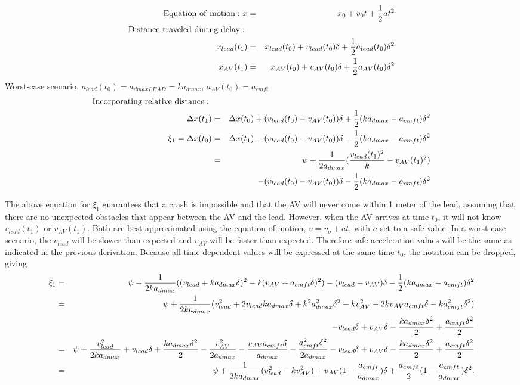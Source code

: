 \documentclass[conference]{IEEEtran}
\begin{document}
\begin{appendix}
\begin{eqnarray*}
{\rm Equation\ of\ motion:\ } x &=& x_0 + v_0t + {1\over 2}at^2 \\
{\rm Distance\ traveled\ during\ delay : \ } \\
x_{lead}(t_1) &=& x_{lead}(t_0)+v_{lead}(t_0)\delta+{1\over 2}a_{lead}(t_0)\delta^2 \\
x_{AV}(t_1) &=& x_{AV}(t_0)+v_{AV}(t_0)\delta+{1\over 2}a_{AV}(t_0)\delta^2
\end{eqnarray*}
Worst-case scenario, $a_{lead}(t_0)=a_{dmaxLEAD}=ka_{dmax}$, $a_{AV}(t_0)=a_{cmft}$
\begin{eqnarray*}
{\rm Incorporating\ relative\ distance:\ } \\
\Delta x(t_1) &=& \Delta x(t_0) + (v_{lead}(t_0)-v_{AV}(t_0))\delta + {1\over 2}(ka_{dmax}-a_{cmft})\delta^2\\
\xi_1 = \Delta x(t_0) &=& \Delta x(t_1) - (v_{lead}(t_0)-v_{AV}(t_0))\delta - {1\over 2}(ka_{dmax}-a_{cmft})\delta^2\\
&=& \psi+{1\over 2a_{dmax}}({v_{lead}(t_1)^2\over k}-v_{AV}(t_1)^2) \\
&& - (v_{lead}(t_0)-v_{AV}(t_0))\delta - {1\over 2}(ka_{dmax}-a_{cmft})\delta^2
\end{eqnarray*}

The above equation for $\xi_1$ guarantees that a crash is impossible and that the AV will never come within 1 meter of the lead, assuming that there are no unexpected obstacles that appear between the AV and the lead. However, when the AV arrives at time $t_0$, it will not know $v_{lead}(t_1)$ or $v_{AV}(t_1)$. Both are best approximated using the equation of motion, $v=v_o+at$, with $a$ set to a safe value. In a worst-case scenario, the $v_{lead}$ will be slower than expected and $v_{AV}$ will be faster than expected. Therefore safe acceleration values will be the same as indicated in the previous derivation. Because all time-dependent values will be expressed at the same time $t_0$, the notation can be dropped, giving
\begin{eqnarray*}
\xi_1 &=& \psi+{1\over 2ka_{dmax}}((v_{lead}+ka_{dmax}\delta)^2-k(v_{AV}+a_{cmft}\delta)^2) - (v_{lead}-v_{AV})\delta - {1\over 2}(ka_{dmax}-a_{cmft})\delta^2 \\
&=& \psi+{1\over 2ka_{dmax}}(v_{lead}^2+2v_{lead}ka_{dmax}\delta+k^2a_{dmax}^2\delta^2-kv_{AV}^2-2kv_{AV}a_{cmft}\delta-ka_{cmft}^2\delta^2) \\
&& -v_{lead}\delta+v_{AV}\delta-{ka_{dmax}\delta^2\over 2}+{a_{cmft}\delta^2\over2} \\
&=& \psi+{v_{lead}^2\over 2ka_{dmax}}+{v_{lead}\delta}+{ka_{dmax}\delta^2 \over 2}-{v_{AV}^2\over 2a_{dmax}}-{v_{AV}a_{cmft}\delta \over a_{dmax}}-{a_{cmft}^2\delta^2\over 2a_{dmax}}-v_{lead}\delta+v_{AV}\delta-{ka_{dmax}\delta^2\over 2}+{a_{cmft}\delta^2\over2} \\
&=& \psi+{1\over 2ka_{dmax}}(v_{lead}^2-kv_{AV}^2)+v_{AV}(1-{a_{cmft}\over a_{dmax}})\delta+{a_{cmft}\over 2}(1-{a_{cmft}\over a_{dmax}})\delta^2.
\end{eqnarray*}


\end{appendix}
\end{document}

